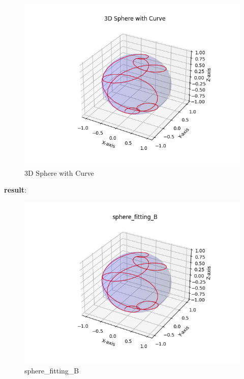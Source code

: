 \documentclass[a4paper]{article}
\begin{document}
    \begin{figure}[H]
    \centering
    \includegraphics{../figure/3D Sphere with Curve.png}
    \caption{3D Sphere with Curve}
    \end{figure}
    
    \textbf{result}:
    
    \begin{figure}[H]
    \centering
    \includegraphics{../figure/sphere_fitting_B.png}
    \caption{sphere\_fitting\_B}
    \end{figure}
            
\end{document}
